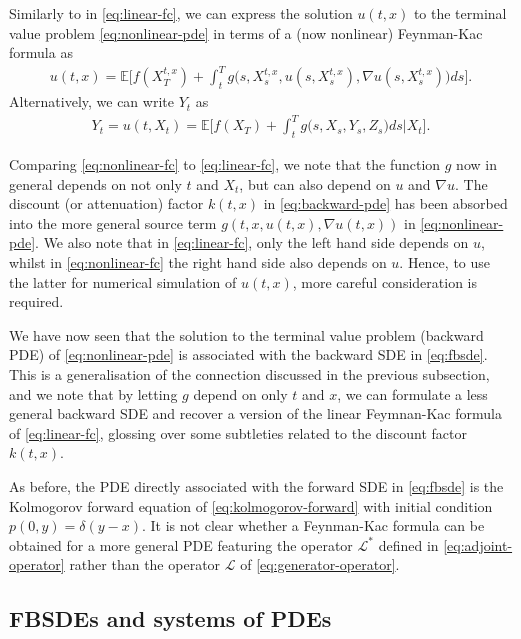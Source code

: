\documentclass{article}  %
\begin{document}
Similarly to in \autoref{eq:linear-fc}, we can express the solution $u(t,x)$ to the terminal value problem \autoref{eq:nonlinear-pde} in terms of a (now nonlinear) Feynman-Kac formula as
%
\begin{align} 
    \label{eq:nonlinear-fc}
    u(t,x) = \mathbb{E}\bigg[ f(X_T^{t,x}) + \int_t^T g\big(s,X_s^{t,x},u(s,X_s^{t,x}),\nabla u(s,X_s^{t,x})\big)ds \bigg].
\end{align} 
%
Alternatively, we can write $Y_t$ as
%
\begin{align} 
    \label{eq:nonlinear-fc-for-y}
    Y_t = u(t,X_t) = \mathbb{E}\bigg[ f(X_T) + \int_t^T g\big(s,X_s,Y_s,Z_s\big)ds \Big\lvert X_t \bigg].
\end{align}
%

Comparing \autoref{eq:nonlinear-fc} to \autoref{eq:linear-fc}, we note that the function $g$ now in general depends on not only $t$ and $X_t$, but can also depend on $u$ and $\nabla u$. The discount (or attenuation) factor $k(t,x)$ in \autoref{eq:backward-pde} has been absorbed into the more general source term $g(t,x,u(t,x),\nabla u(t,x))$ in \autoref{eq:nonlinear-pde}. We also note that in \autoref{eq:linear-fc}, only the left hand side depends on $u$, whilst in \autoref{eq:nonlinear-fc} the right hand side also depends on $u$. Hence, to use the latter for numerical simulation of $u(t,x)$, more careful consideration is required.

We have now seen that the solution to the terminal value problem (backward PDE) of \autoref{eq:nonlinear-pde} is associated with the backward SDE in \autoref{eq:fbsde}. This is a generalisation of the connection discussed in the previous subsection, and we note that by letting $g$ depend on only $t$ and $x$, we can formulate a less general backward SDE and recover a version of the linear Feymnan-Kac formula of \autoref{eq:linear-fc}, glossing over some subtleties related to the discount factor $k(t,x)$.

As before, the PDE directly associated with the forward SDE in \autoref{eq:fbsde} is the Kolmogorov forward equation of \autoref{eq:kolmogorov-forward} with initial condition $p(0,y)=\delta(y-x)$. It is not clear whether a Feynman-Kac formula can be obtained for a more general PDE featuring the operator $\mathcal{L}^*$ defined in \autoref{eq:adjoint-operator} rather than the operator $\mathcal{L}$ of \autoref{eq:generator-operator}. 

\subsection{FBSDEs and systems of PDEs}
\end{document}
